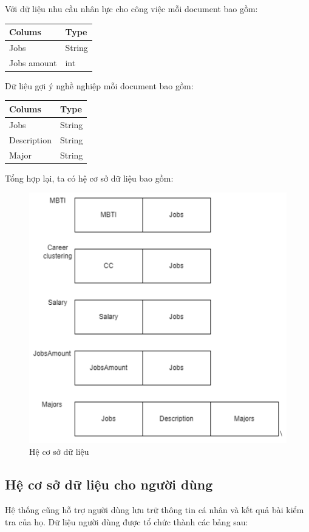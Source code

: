 Với dữ liệu nhu cầu nhân lực cho công việc mỗi document bao gồm:

\begin{table}[H]
    \centering
    \begin{tabular}{@{}ll@{}}
        \toprule
        \textbf{Colums} & \textbf{Type} \\ \midrule
        Jobs & String \\
        Jobs amount & int \\
        \bottomrule
    \end{tabular}
\end{table}

Dữ liệu gợi ý nghề nghiệp mỗi document bao gồm:
\begin{table}[H]
    \centering
    \begin{tabular}{@{}ll@{}}
        \toprule
        \textbf{Colums} & \textbf{Type} \\ \midrule
        Jobs & String \\
        Description & String \\
        Major & String \\
        \bottomrule
    \end{tabular}
\end{table}

Tổng hợp lại, ta có hệ cơ sở dữ liệu bao gồm:
\begin{figure}[H]
    \centering
    \includegraphics[width=0.6\linewidth]{images/database.png}
    \vspace{0.5cm}
    \caption{Hệ cơ sở dữ liệu}
\end{figure}

\subsection{Hệ cơ sở dữ liệu cho người dùng}
Hệ thống cũng hỗ trợ người dùng lưu trữ thông tin cá nhân và kết quả bài kiểm tra của họ. Dữ liệu người dùng được tổ chức thành các bảng sau:

